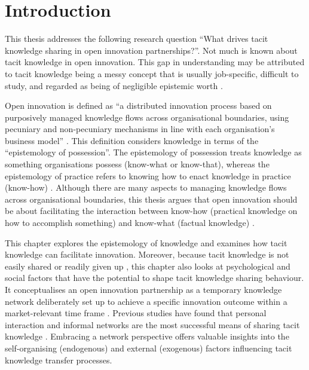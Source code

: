 \section{Introduction}

This thesis addresses the following research question \enquote{What drives tacit knowledge sharing in open innovation partnerships?}. Not much is known about tacit knowledge in open innovation. This gap in understanding may be attributed to tacit knowledge being a messy concept that is usually job-specific, difficult to study, and regarded as being of negligible epistemic worth \citep{mohajan2016sharing}. \medskip

Open innovation is defined as \enquote{a distributed innovation process based on purposively managed knowledge flows across organisational boundaries, using pecuniary and non-pecuniary mechanisms in line with each organisation’s business model} \citep[][pg. 17]{chesbrough2014explicating}. This definition considers knowledge in terms of the \enquote{epistemology of possession}. The epistemology of possession treats knowledge as something organisations possess (know-what or know-that), whereas the epistemology of practice refers to knowing how to enact knowledge in practice (know-how) \citep{cook1999bridging}. Although there are many aspects to managing knowledge flows across organisational boundaries, this thesis argues that open innovation should be about facilitating the interaction between know-how (practical knowledge on how to accomplish something) and know-what (factual knowledge) \citep{winter1987knowledge, garud1997distinction}.  \medskip

This chapter explores the epistemology of knowledge and examines how tacit knowledge can facilitate innovation. Moreover, because tacit knowledge is not easily shared or readily given up \citep{von1994sticky, szulanski2003sticky, seidler2008use}, this chapter also looks at psychological and social factors that have the potential to shape tacit knowledge sharing behaviour. It conceptualises an open innovation partnership as a temporary knowledge network deliberately set up to achieve a specific innovation outcome within a market-relevant time frame \citep{cococcioni2014exploring,terhorst2018tacit}. Previous studies have found that personal interaction and informal networks are the most successful means of sharing tacit knowledge \citep{holste2010trust,mohajan2016sharing,khatun2018sharing}. Embracing a network perspective offers valuable insights into the self-organising (endogenous) and external (exogenous) factors influencing tacit knowledge transfer processes. \medskip

